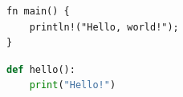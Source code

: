\begin{verbatim}
fn main() {
    println!("Hello, world!");
}
\end{verbatim}

\begin{lstlisting}[language=Python]
def hello():
    print("Hello!")
\end{lstlisting}
